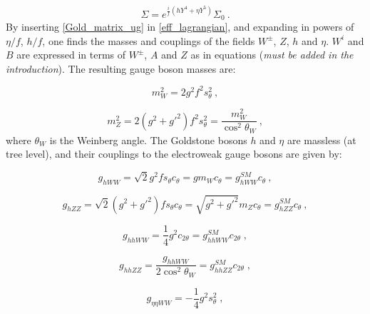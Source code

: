 \begin{equation}
\Sigma = e^{\frac{i}{f} (h Y^4 + \eta Y^5)} \Sigma_0 \: .
\label{Gold_matrix_ug}
\end{equation}
%
By inserting \ref{Gold_matrix_ug} in \ref{eff_lagrangian}, and expanding in powers of $\eta/f$, $h/f$, one finds the masses and couplings of the fields $W^{\pm}$, $Z$, $h$ and $\eta$. $W^i$ and $B$ are expressed in terms of $W^{\pm}$, $A$ and $Z$ as in equations (\emph{must be added in the introduction}). The resulting gauge boson masses are:

\begin{equation}
m^2_{W} = 2 g^2 f^2 s_{\theta}^2 \: ,
\end{equation}

\begin{equation}
m^2_Z = 2 (g^2 + {g'}^2) f^2 s_{\theta}^2 = \frac{m_W^2}{\cos^2\theta_W} \: ,
\end{equation}
%
where $\theta_W$ is the Weinberg angle. The Goldstone bosons $h$ and $\eta$ are massless (at tree level), and their couplings to the electroweak gauge bosons are given by:

\begin{equation}
g_{hWW} = \sqrt 2 g^2 f s_{\theta} c_{\theta} = g m_W c_{\theta} = g^{SM}_{hWW} c_{\theta} \: ,
\end{equation}

\begin{equation}
g_{hZZ} = \sqrt 2 (g^2 + {g'}^2) f s_{\theta} c_{\theta} = \sqrt{g^2 + {g'}^2} m_Z c_{\theta} = g^{SM}_{hZZ} c_{\theta} \: ,
\end{equation}

\begin{equation}
g_{hhWW} = \frac{1}{4} g^2 c_{2 \theta} = g_{hhWW}^{SM} c_{2 \theta} \; ,
\end{equation}

\begin{equation}
g_{hhZZ} = \frac{g_{hhWW}}{2 \cos^2 \theta_W}  = g_{hhZZ}^{SM} c_{2 \theta} \; ,
\end{equation}

\begin{equation}
g_{\eta \eta WW} = - \frac{1}{4} g^2 s_{\theta}^2 \; ,
\end{equation} 

